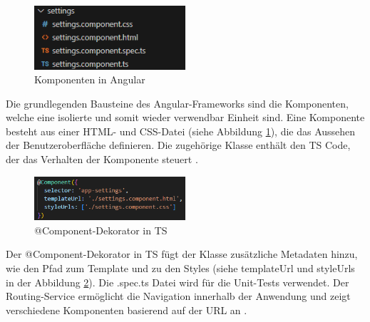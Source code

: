 \begin{figure}[h]
	\centering
	\includegraphics[width=0.5\textwidth]{images/Komponente.png}
	\caption[Komponenten in Angular]{Komponenten in Angular}
	\label{fig:KomponentenAngular}
\end{figure}
Die grundlegenden Bausteine des Angular-Frameworks sind die Komponenten, welche eine isolierte und somit wieder verwendbar Einheit sind. 
Eine Komponente besteht aus einer HTML- und CSS-Datei (siehe Abbildung \ref{fig:KomponentenAngular}), die das Aussehen der Benutzeroberfläche definieren. Die zugehörige Klasse enthält den TS Code, der das Verhalten der Komponente steuert \cite{angular_arch}.\\

\begin{figure}[h]
	\centering
	\includegraphics[width=0.5\textwidth]{images/@Component.png}
	\caption[@Component-Dekorator in TS]{@Component-Dekorator in TS}
	\label{fig:@Component}
\end{figure}
Der @Component-Dekorator in TS fügt der Klasse zusätzliche Metadaten hinzu, wie den Pfad zum Template und zu den Styles (siehe templateUrl und styleUrls in der Abbildung \ref{fig:@Component}). Die .spec.ts Datei wird für die Unit-Tests verwendet.
Der Routing-Service ermöglicht die Navigation innerhalb der Anwendung und zeigt verschiedene Komponenten basierend auf der URL an \cite{angular_arch}.\\